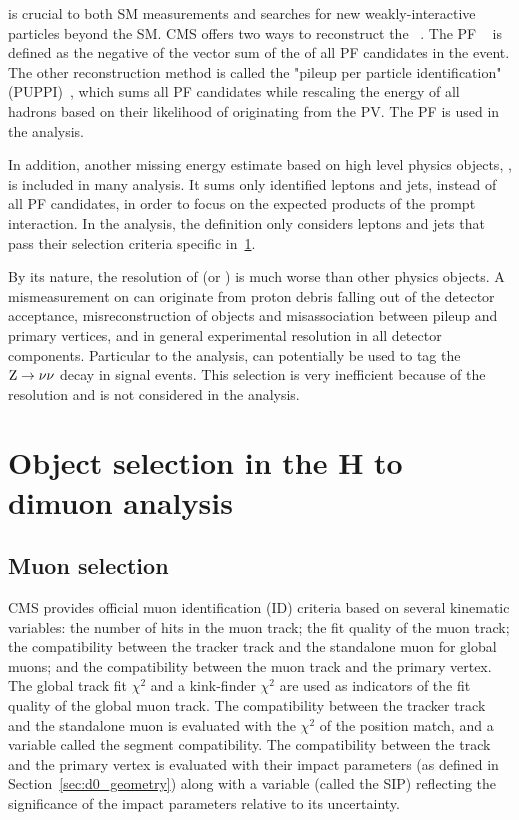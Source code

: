 \MET is crucial to both SM measurements and searches for new weakly-interactive particles beyond the SM.
CMS offers two ways to reconstruct the \MET~\cite{Sirunyan_2019}.
The PF \MET~\cite{collaboration_2015} is defined as the negative of the vector sum of the \pt of all PF candidates in the event.
The other reconstruction method is called the "pileup per particle identification" (PUPPI)~\cite{Bertolini2014},
which sums all PF candidates while rescaling the energy of all hadrons based on their likelihood of originating from the PV.
The PF \MET is used in the \hmm analysis.

In addition, another missing energy estimate based on high level physics objects, \MHT, is included in many analysis.
It sums only identified leptons and jets, instead of all PF candidates, 
in order to focus on the expected products of the prompt interaction.
In the \hmm analysis, the \MHT definition only considers leptons and jets that pass their selection criteria specific in~\ref{sec:obj_sel}. 

By its nature, the resolution of \MET (or \MHT) is much worse than other physics objects.
A mismeasurement on \MET can originate from proton debris falling out of the detector acceptance,
misreconstruction of objects and misassociation between pileup and primary vertices,
and in general experimental resolution in all detector components.
Particular to the \hmm analysis, \MET can potentially be used to tag the $\mathrm{Z} \to \nu\nu$ decay in \ZH signal events.
This selection is very inefficient because of the \MET resolution and is not considered in the \hmm analysis.

\section{Object selection in the H to dimuon analysis}\label{sec:obj_sel}

\subsection{Muon selection}\label{sec:sel_muon}

CMS provides official muon identification (ID) criteria based on several kinematic variables:
the number of hits in the muon track; the fit quality of the muon track; 
the compatibility between the tracker track and the standalone muon for global muons;
and the compatibility between the muon track and the primary vertex.
The global track fit $\chi^{2}$ and a kink-finder $\chi^{2}$ are used as indicators of the fit quality of the global muon track.
The compatibility between the tracker track and the standalone muon is evaluated with the $\chi^{2}$ of the position match, 
and a variable called the segment compatibility.
The compatibility between the track and the primary vertex is evaluated with their impact parameters (as defined in Section~\ref{sec:d0_geometry})
along with a variable (called the SIP) reflecting the significance of the impact parameters relative to its uncertainty.

